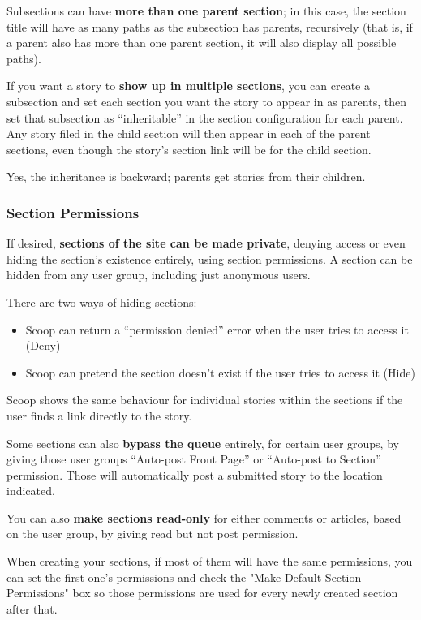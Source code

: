Subsections can have {\bf more than one parent section}; in this case, the section title will have as many paths as the subsection has parents, recursively (that is, if a parent also has more than one parent section, it will also display all possible paths).

If you want a story to {\bf show up in multiple sections}, you can create a subsection and set each section you want the story to appear in as parents, then set that subsection as ``inheritable'' in the section configuration for each parent.  Any story filed in the child section will then appear in each of the parent sections, even though the story's section link will be for the child section.  

Yes, the inheritance is backward; parents get stories from their children.

\subsubsection{Section Permissions}
\label{sections-perms}

If desired, {\bf sections of the site can be made private}, denying access or even hiding the section's existence entirely, using section permissions.  A section can be hidden from any user group, including just anonymous users.  

There are two ways of hiding sections: 
\begin{itemize}
\item Scoop can return a ``permission denied'' error when the user tries to access it (Deny) 
\item Scoop can pretend the section doesn't exist if the user tries to access it (Hide)
\end{itemize}

Scoop shows the same behaviour for individual stories within the sections if the user finds a link directly to the story.

Some sections can also {\bf bypass the queue} entirely, for certain user groups, by giving those user groups ``Auto-post Front Page'' or ``Auto-post to Section'' permission.  Those will automatically post a submitted story to the location indicated.

You can also {\bf make sections read-only} for either comments or articles, based on the user group, by giving read but not post permission.

When creating your sections, if most of them will have the same permissions, you can set the first one's permissions and check the "Make Default Section Permissions" box so those permissions are used for every newly created section after that.

